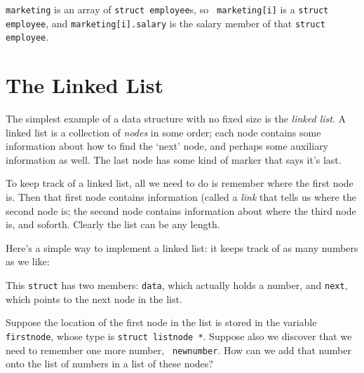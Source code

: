 
{\tt marketing} is an array of {\tt struct employee}s, so {\tt
marketing[i]} is a {\tt struct employee}, and {\tt marketing[i].salary}
is the salary member of that {\tt struct employee}. 

\section{The Linked List}

The simplest example of a data structure with no fixed size is the {\em
linked list}\/.  A linked list is a collection of {\em nodes} in some
order; each node contains some information about how to find the `next'
node, and perhaps some auxiliary information as well.  The last node has
some kind of marker that says it's last.  

To keep track of a linked list, all we need to do is remember where the
first node is.  Then that first node contains information (called a {\em
link}\/ that tells us where the second node is; the second node contains
information about where the third node is, and soforth. Clearly the list
can be any length.  

Here's a simple way to implement a linked list: it keeps track of as
many numbers as we like:

\begin{flushleft}
\verb% struct listnode {% \\*
\verb%   int data; % \\*
\verb%   struct listnode *next; % \\*
\verb%} ; % 
\end{flushleft}

This {\tt struct} has two members:  {\tt data}, which actually holds a
number, and {\tt next}, which points to the next node in the list.  

Suppose the location of the first node in the list is stored in the
variable {\tt firstnode}, whose type is {\tt struct listnode *}.
Suppose also we discover that we need to remember one more number, {\tt
newnumber}.  How can we add that number onto the list of numbers in a
list of these nodes?

